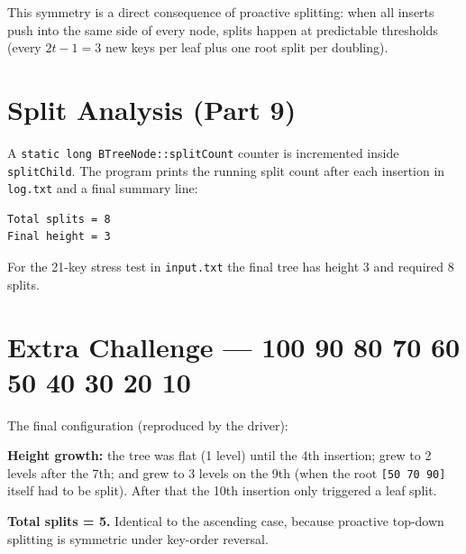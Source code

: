 \documentclass[11pt,a4paper]{article}
\begin{document}
\noindent This symmetry is a direct consequence of proactive splitting: when all inserts push into the same side of every node, splits happen at predictable thresholds (every $2t-1 = 3$ new keys per leaf plus one root split per doubling).

\section{Split Analysis (Part 9)}

A \texttt{static long BTreeNode::splitCount} counter is incremented inside \texttt{splitChild}. The program prints the running split count after each insertion in \texttt{log.txt} and a final summary line:

\begin{lstlisting}[style=plain]
Total splits = 8
Final height = 3
\end{lstlisting}

\noindent For the 21-key stress test in \texttt{input.txt} the final tree has height 3 and required 8 splits.

\section{Extra Challenge --- 100 90 80 70 60 50 40 30 20 10}

The final configuration (reproduced by the driver):

\begin{center}
\end{center}

\noindent \textbf{Height growth:}
the tree was flat (1 level) until the 4th insertion; grew to 2 levels after the 7th; and grew to 3 levels on the 9th (when the root \texttt{[50 70 90]} itself had to be split). After that the 10th insertion only triggered a leaf split.

\noindent \textbf{Total splits = 5.} Identical to the ascending case, because proactive top-down splitting is symmetric under key-order reversal.
\end{document}

